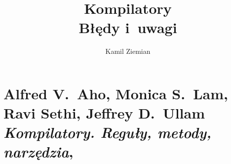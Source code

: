\documentclass[a4paper,11pt]{article}
\title{Kompilatory \\
  {\Large Błędy i~uwagi}}
\author{Kamil Ziemian}
\numberwithin{equation}{section}
\begin{document}





\maketitle










\section{Alfred V.~Aho, Monica S.~Lam, Ravi Sethi,
  Jeffrey D.~Ullam \textit{Kompilatory. Reguły, metody,
    narzędzia},
  \parencite{Aho-Lam-Sethi-Ullman-Kompilatory-Pub-2019}}

\vspace{0em}



\vspace{0em}



\end{document}
